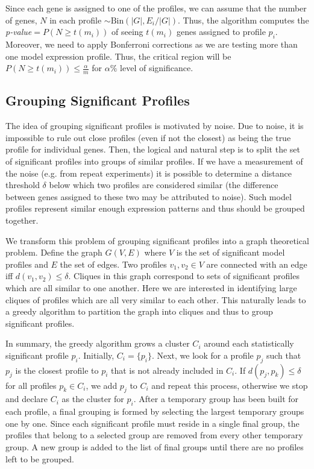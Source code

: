 Since each gene is assigned to one of the profiles, we can assume that the number of genes, $N$ in each profile $\sim \text{Bin}(|G|,E_i/|G|)$. Thus, the algorithm computes the \textit{p-value}$= P(N \geq t(m_i))$ of seeing $t(m_i)$ genes assigned to profile $p_i$. Moreover, we need to apply Bonferroni corrections as we are testing more than one model expression profile. Thus, the critical region will be $P(N \geq t(m_i)) \le \frac{\alpha}{m}$ for $\alpha \%$ level of significance.

\subsection{Grouping Significant Profiles}

The idea of grouping significant profiles is motivated by noise. Due to noise, it is impossible to rule out close profiles (even if not the closest) as being the true profile for individual genes. Then, the logical and natural step is to split the set of significant profiles into groups of similar profiles. If we have a measurement of the noise (e.g. from repeat experiments) it is possible to determine a distance threshold $\delta$ below which two profiles are considered similar (the difference between genes assigned to these two may be attributed to noise). Such model profiles represent similar enough expression patterns and thus should be grouped together.

We transform this problem of grouping significant profiles into a graph theoretical problem. Define the graph $G(V,E)$ where $V$ is the set of significant model profiles and $E$ the set of edges. Two profiles $v_1,v_2 \in V$ are connected with an edge iff $d(v_1,v_2) \leq \delta$. Cliques in this graph correspond to sets of significant profiles which are all similar to one another. Here we are interested in identifying large cliques of profiles which are all very similar to each other. This naturally leads to a greedy algorithm to partition the graph into cliques and thus to group significant profiles.

In summary, the greedy algorithm grows a cluster $C_i$ around each statistically significant profile $p_i$. Initially, $C_i = \{p_i\}$. Next, we look for a profile $p_j$ such that $p_j$ is the closest profile to $p_i$ that is not already included in $C_i$. If $d(p_j,p_k) \leq \delta$ for all profiles $p_k \in C_i$, we add $p_j$ to $C_i$ and repeat this process, otherwise we stop and declare $C_i$ as the cluster for $p_i$. After a temporary group has been built for each profile, a final grouping is formed by selecting the largest temporary groups one by one. Since each significant profile must reside in a single final group, the profiles that belong to a selected group are removed from every other temporary group. A new group is added to the list of final groups until there are no profiles left to be grouped. 

